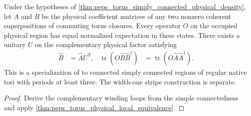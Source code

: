 \begin{lemma}%
    \label{thm:peps_torus_simply_connected_physical_local_equivalence}
    \leanok
    Under the hypotheses of
    \ref{thm:peps_torus_simply_connected_physical_density}, let $A$ and
    $B$ be the physical coefficient matrices of any two nonzero
    coherent superpositions of commuting torus closures.
    Every operator $O$ on the occupied physical region has equal
    normalized expectation in these states. There exists a unitary
    $U$ on the complementary physical factor satisfying
    \begin{align}
        \widehat B & =\widehat A U^{\mathsf T},                         &
        \operatorname{tr}(O\widehat B\widehat B^\dagger)
                   & =\operatorname{tr}(O\widehat A\widehat A^\dagger).
        \label{eq:peps_simply_connected_local_equivalence}
    \end{align}
    This is a specialization of
    \cite[Theorem~6.7 and Corollary~6.8]{Schuch2010PEPS} to connected
    simply connected regions of regular native tori with periods at
    least three. The width-one stripe construction is separate.
\end{lemma}

\begin{proof}\leanok
    Derive the complementary winding loops from the simple
    connectedness and apply
    \ref{thm:peps_torus_physical_local_equivalence}.
\end{proof}
